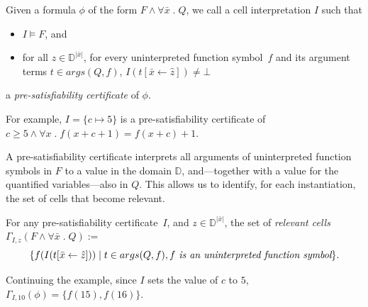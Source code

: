 \documentclass[runningheads]{llncs}
\newcommand{\numvar}[1]{|#1|}
\newcommand{\domain}{\mathbb{D}}
\newcommand{\subst}[3]{#1[#2\leftarrow #3]}
\newcommand{\repr}[1]{\hat{#1}}
\begin{document}
\begin{definition}%
	\label{def:pre-sat-cert}
	Given a formula $\phi$ of the form $F\wedge \forall \bar{x}\;.\; Q$, we call a cell interpretation $I$ such that
	\begin{itemize}
		\item $I\models F$, and
		\item for all $z\in\domain^{\numvar{\bar{x}}}$, for every uninterpreted function symbol~$f$ and its argument terms $t\in args(Q, f)$, $I(\subst{t}{\bar{x}}{\repr{z}})\neq\bot$
	\end{itemize}
	a \emph{pre-satisfiability certificate} of $\phi$.
\end{definition}
For example, $I=\{ c\mapsto 5 \}$ is a pre-satisfiability certificate of $c\geq 5 \wedge \forall x \;.\; f(x+c+1)= f(x+c)+1$.

A pre-satisfiability  certificate interprets all arguments of uninterpreted function symbols in $F$ to a value in the domain $\domain$, and---together with a value for the quantified variables---also in $Q$. This allows us to identify, for each instantiation, the set of cells that become relevant.
\begin{definition}
  For any pre-satisfiability certificate~$I$, and $z\in\domain^{\numvar{\bar{x}}}$, the set of \emph{relevant cells} $\Gamma_{I,z}(F\wedge \forall \bar{x}\;.\; Q):=$
\[\{ f(I(\subst{t}{\bar{x}}{\repr{z}})) \mid t\in args(Q, f), f \emph{ is an uninterpreted function symbol}\}.\]
\end{definition}
Continuing the example, since $I$ sets the value of $c$ to $5$, $\Gamma_{I,10}(\phi)=\{ f(15), f(16)\}$.
\end{document}
